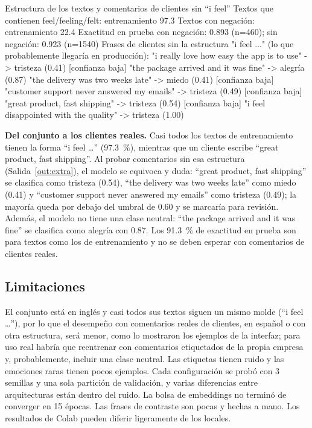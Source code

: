 \documentclass[11pt,letterpaper]{article}
\begin{document}
\begin{consola}[label=out:extra]{Estructura de los textos y comentarios de clientes sin ``i feel''}
Textos que contienen feel/feeling/felt: entrenamiento 97.3%
Textos con negación: entrenamiento 22.4%
Exactitud en prueba con negación: 0.893 (n=460); sin negación: 0.923 (n=1540)
Frases de clientes sin la estructura "i feel ..." (lo que probablemente llegaría en producción):
  "i really love how easy the app is to use" -> tristeza (0.41)  [confianza baja]
  "the package arrived and it was fine" -> alegría (0.87)
  "the delivery was two weeks late" -> miedo (0.41)  [confianza baja]
  "customer support never answered my emails" -> tristeza (0.49)  [confianza baja]
  "great product, fast shipping" -> tristeza (0.54)  [confianza baja]
  "i feel disappointed with the quality" -> tristeza (1.00)
\end{consola}

\textbf{Del conjunto a los clientes reales.} Casi todos los textos de entrenamiento tienen la forma ``i feel \ldots'' (97.3~\%), mientras que un cliente escribe ``great product, fast shipping''. Al probar comentarios sin esa estructura (Salida~\ref{out:extra}), el modelo se equivoca y duda: ``great product, fast shipping'' se clasifica como tristeza (0.54), ``the delivery was two weeks late'' como miedo (0.41) y ``customer support never answered my emails'' como tristeza (0.49); la mayoría queda por debajo del umbral de 0.60 y se marcaría para revisión. Además, el modelo no tiene una clase neutral: ``the package arrived and it was fine'' se clasifica como alegría con 0.87. Los 91.3~\% de exactitud en prueba son para textos como los de entrenamiento y no se deben esperar con comentarios de clientes reales.

\subsection{Limitaciones}

El conjunto está en inglés y casi todos sus textos siguen un mismo molde (``i feel \ldots''), por lo que el desempeño con comentarios reales de clientes, en español o con otra estructura, será menor, como lo mostraron los ejemplos de la interfaz; para uso real habría que reentrenar con comentarios etiquetados de la propia empresa y, probablemente, incluir una clase neutral. Las etiquetas tienen ruido y las emociones raras tienen pocos ejemplos. Cada configuración se probó con 3 semillas y una sola partición de validación, y varias diferencias entre arquitecturas están dentro del ruido. La bolsa de embeddings no terminó de converger en 15 épocas. Las frases de contraste son pocas y hechas a mano. Los resultados de Colab pueden diferir ligeramente de los locales.
\end{document}
